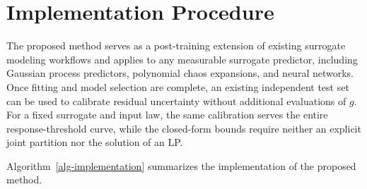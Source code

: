 \documentclass[review,11pt,3p,authoryear,nopreprintline]{elsarticle}
\begin{document}


\section{Implementation Procedure}
\label{sec-implementation}

The proposed method serves as a post-training extension of existing surrogate modeling workflows and applies to any measurable surrogate predictor, including Gaussian process predictors, polynomial chaos expansions, and neural networks. Once fitting and model selection are complete, an existing independent test set can be used to calibrate residual uncertainty without additional evaluations of $g$. For a fixed surrogate and input law, the same calibration serves the entire response-threshold curve, while the closed-form bounds require neither an explicit joint partition nor the solution of an LP.

Algorithm~\ref{alg-implementation} summarizes the implementation of the proposed method.
\end{document}
